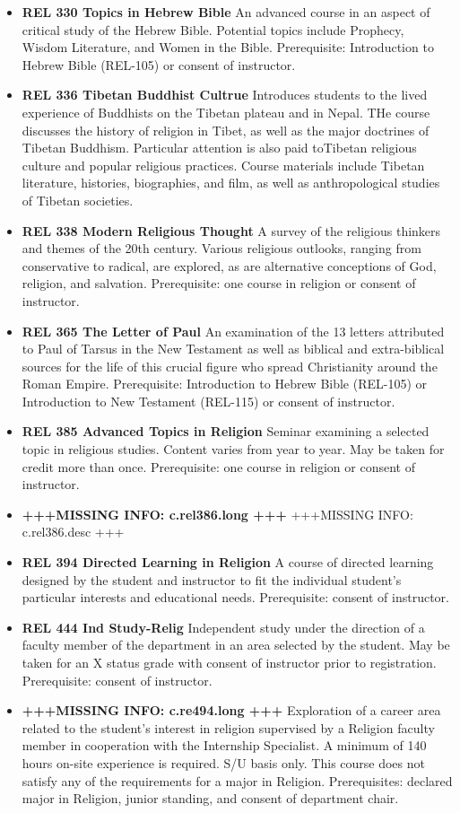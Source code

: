\documentclass[
  letterpaper,
]{scrbook}
\begin{document}
\begin{itemize}
\item
  \textbf{REL 330 Topics in Hebrew Bible} An advanced course in an
  aspect of critical study of the Hebrew Bible. Potential topics include
  Prophecy, Wisdom Literature, and Women in the Bible. Prerequisite:
  Introduction to Hebrew Bible (REL-105) or consent of instructor.
\item
  \textbf{REL 336 Tibetan Buddhist Cultrue} Introduces students to the
  lived experience of Buddhists on the Tibetan plateau and in Nepal. THe
  course discusses the history of religion in Tibet, as well as the
  major doctrines of Tibetan Buddhism. Particular attention is also paid
  toTibetan religious culture and popular religious practices. Course
  materials include Tibetan literature, histories, biographies, and
  film, as well as anthropological studies of Tibetan societies.
\item
  \textbf{REL 338 Modern Religious Thought} A survey of the religious
  thinkers and themes of the 20th century. Various religious outlooks,
  ranging from conservative to radical, are explored, as are alternative
  conceptions of God, religion, and salvation. Prerequisite: one course
  in religion or consent of instructor.
\item
  \textbf{REL 365 The Letter of Paul} An examination of the 13 letters
  attributed to Paul of Tarsus in the New Testament as well as biblical
  and extra-biblical sources for the life of this crucial figure who
  spread Christianity around the Roman Empire. Prerequisite:
  Introduction to Hebrew Bible (REL-105) or Introduction to New
  Testament (REL-115) or consent of instructor.
\item
  \textbf{REL 385 Advanced Topics in Religion} Seminar examining a
  selected topic in religious studies. Content varies from year to year.
  May be taken for credit more than once. Prerequisite: one course in
  religion or consent of instructor.\\
\item
  \textbf{+++MISSING INFO: c.rel386.long +++} +++MISSING INFO:
  c.rel386.desc +++
\item
  \textbf{REL 394 Directed Learning in Religion} A course of directed
  learning designed by the student and instructor to fit the individual
  student's particular interests and educational needs. Prerequisite:
  consent of instructor.
\item
  \textbf{REL 444 Ind Study-Relig} Independent study under the direction
  of a faculty member of the department in an area selected by the
  student. May be taken for an X status grade with consent of instructor
  prior to registration. Prerequisite: consent of instructor.
\item
  \textbf{+++MISSING INFO: c.re494.long +++} Exploration of a career
  area related to the student's interest in religion supervised by a
  Religion faculty member in cooperation with the Internship Specialist.
  A minimum of 140 hours on-site experience is required. S/U basis only.
  This course does not satisfy any of the requirements for a major in
  Religion. Prerequisites: declared major in Religion, junior standing,
  and consent of department chair.
\end{itemize}
\end{document}
